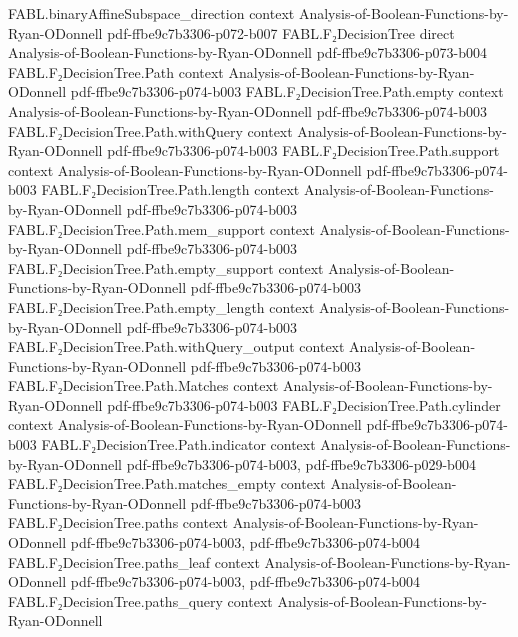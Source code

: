 \begin{theorem}
\proofstep
  {FABL.binaryAffineSubspace_direction}
  {context}
  {Analysis-of-Boolean-Functions-by-Ryan-ODonnell}
  {pdf-ffbe9c7b3306-p072-b007}
\proofstep
  {FABL.F₂DecisionTree}
  {direct}
  {Analysis-of-Boolean-Functions-by-Ryan-ODonnell}
  {pdf-ffbe9c7b3306-p073-b004}
\proofstep
  {FABL.F₂DecisionTree.Path}
  {context}
  {Analysis-of-Boolean-Functions-by-Ryan-ODonnell}
  {pdf-ffbe9c7b3306-p074-b003}
\proofstep
  {FABL.F₂DecisionTree.Path.empty}
  {context}
  {Analysis-of-Boolean-Functions-by-Ryan-ODonnell}
  {pdf-ffbe9c7b3306-p074-b003}
\proofstep
  {FABL.F₂DecisionTree.Path.withQuery}
  {context}
  {Analysis-of-Boolean-Functions-by-Ryan-ODonnell}
  {pdf-ffbe9c7b3306-p074-b003}
\proofstep
  {FABL.F₂DecisionTree.Path.support}
  {context}
  {Analysis-of-Boolean-Functions-by-Ryan-ODonnell}
  {pdf-ffbe9c7b3306-p074-b003}
\proofstep
  {FABL.F₂DecisionTree.Path.length}
  {context}
  {Analysis-of-Boolean-Functions-by-Ryan-ODonnell}
  {pdf-ffbe9c7b3306-p074-b003}
\proofstep
  {FABL.F₂DecisionTree.Path.mem_support}
  {context}
  {Analysis-of-Boolean-Functions-by-Ryan-ODonnell}
  {pdf-ffbe9c7b3306-p074-b003}
\proofstep
  {FABL.F₂DecisionTree.Path.empty_support}
  {context}
  {Analysis-of-Boolean-Functions-by-Ryan-ODonnell}
  {pdf-ffbe9c7b3306-p074-b003}
\proofstep
  {FABL.F₂DecisionTree.Path.empty_length}
  {context}
  {Analysis-of-Boolean-Functions-by-Ryan-ODonnell}
  {pdf-ffbe9c7b3306-p074-b003}
\proofstep
  {FABL.F₂DecisionTree.Path.withQuery_output}
  {context}
  {Analysis-of-Boolean-Functions-by-Ryan-ODonnell}
  {pdf-ffbe9c7b3306-p074-b003}
\proofstep
  {FABL.F₂DecisionTree.Path.Matches}
  {context}
  {Analysis-of-Boolean-Functions-by-Ryan-ODonnell}
  {pdf-ffbe9c7b3306-p074-b003}
\proofstep
  {FABL.F₂DecisionTree.Path.cylinder}
  {context}
  {Analysis-of-Boolean-Functions-by-Ryan-ODonnell}
  {pdf-ffbe9c7b3306-p074-b003}
\proofstep
  {FABL.F₂DecisionTree.Path.indicator}
  {context}
  {Analysis-of-Boolean-Functions-by-Ryan-ODonnell}
  {pdf-ffbe9c7b3306-p074-b003,
    pdf-ffbe9c7b3306-p029-b004}
\proofstep
  {FABL.F₂DecisionTree.Path.matches_empty}
  {context}
  {Analysis-of-Boolean-Functions-by-Ryan-ODonnell}
  {pdf-ffbe9c7b3306-p074-b003}
\proofstep
  {FABL.F₂DecisionTree.paths}
  {context}
  {Analysis-of-Boolean-Functions-by-Ryan-ODonnell}
  {pdf-ffbe9c7b3306-p074-b003,
    pdf-ffbe9c7b3306-p074-b004}
\proofstep
  {FABL.F₂DecisionTree.paths_leaf}
  {context}
  {Analysis-of-Boolean-Functions-by-Ryan-ODonnell}
  {pdf-ffbe9c7b3306-p074-b003,
    pdf-ffbe9c7b3306-p074-b004}
\proofstep
  {FABL.F₂DecisionTree.paths_query}
  {context}
  {Analysis-of-Boolean-Functions-by-Ryan-ODonnell}

\end{theorem}
